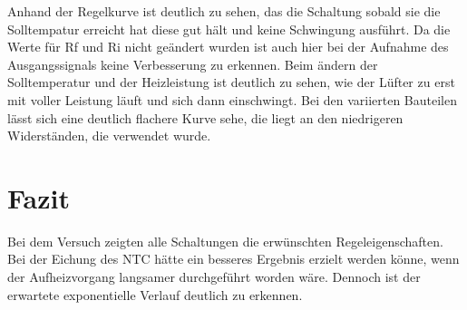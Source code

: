 \documentclass[12pt,a4paper]{article}
\begin{document}
Anhand der Regelkurve ist deutlich zu sehen, das die Schaltung sobald sie die Solltempatur erreicht hat diese gut hält und keine Schwingung ausführt. Da die Werte für Rf und Ri nicht geändert wurden ist auch hier bei der Aufnahme des Ausgangssignals keine Verbesserung zu erkennen. Beim ändern der Solltemperatur und der Heizleistung ist deutlich zu sehen, wie der Lüfter zu erst mit voller Leistung läuft und sich dann einschwingt. Bei den variierten Bauteilen lässt sich eine deutlich flachere Kurve sehe, die liegt an den niedrigeren Widerständen, die verwendet wurde. 

\section{Fazit}

Bei dem Versuch zeigten alle Schaltungen die erwünschten Regeleigenschaften. Bei der Eichung des NTC hätte ein besseres Ergebnis erzielt werden könne, wenn der Aufheizvorgang langsamer durchgeführt worden wäre. Dennoch ist der erwartete exponentielle Verlauf deutlich zu erkennen.
\end{document}
